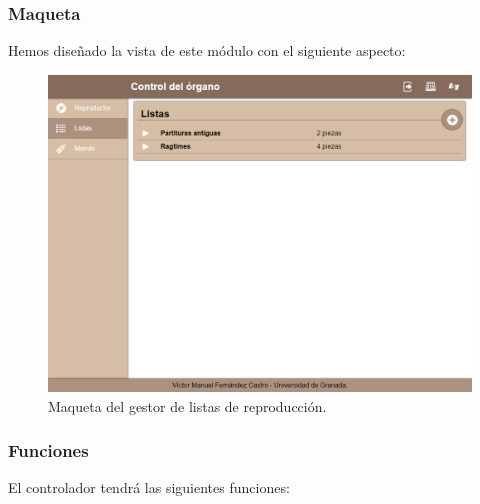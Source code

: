 \subsubsection{Maqueta}

Hemos diseñado la vista de este módulo con el siguiente aspecto:

\smallskip

\begin{figure}[H]
	\noindent \begin{centering}
		\includegraphics[width=\linewidth*3/4]{capitulo4/cap_listas}
		\par\end{centering}
	\smallskip
	\caption{\label{fig:cap_listas} Maqueta del gestor de listas de reproducción.}
\end{figure} 

\smallskip

\subsubsection{Funciones}

El controlador tendrá las siguientes funciones:

